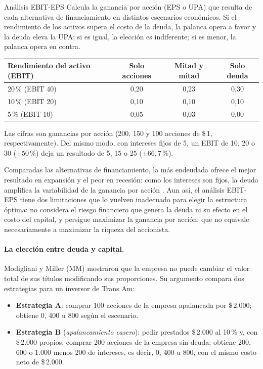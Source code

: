 \begin{definicion}{Análisis EBIT-EPS}
Calcula la ganancia por acción (EPS o UPA) que resulta de cada alternativa de financiamiento en distintos escenarios económicos. Si el rendimiento de los activos supera el costo de la deuda, la palanca opera a favor y la deuda eleva la UPA; si es igual, la elección es indiferente; si es menor, la palanca opera en contra.
\end{definicion}

\begin{ejemplo}[Tres formas de financiar \$\,100 que llevan el activo a \$\,200 ($k_d = 10\,\%$)]
\begin{center}
\begin{tabular}{@{}lccc@{}}
\toprule
Rendimiento del activo (EBIT) & Solo acciones & Mitad y mitad & Solo deuda\\
\midrule
20\,\% (EBIT 40) & 0,20 & 0,23 & 0,30\\
10\,\% (EBIT 20) & 0,10 & 0,10 & 0,10\\
5\,\% (EBIT 10) & 0,05 & 0,03 & 0,00\\
\bottomrule
\end{tabular}
\end{center}
Las cifras son ganancias por acción (200, 150 y 100 acciones de \$\,1, respectivamente). Del mismo modo, con intereses fijos de 5, un EBIT de 10, 20 o 30 ($\pm 50\,\%$) deja un resultado de 5, 15 o 25 ($\pm 66{,}7\,\%$).
\end{ejemplo}

Comparadas las alternativas de financiamiento, la más endeudada ofrece el mejor resultado en expansión y el peor en recesión: como los intereses son fijos, la deuda amplifica la variabilidad de la ganancia por acción . Aun así, el análisis EBIT-EPS tiene dos limitaciones que lo vuelven inadecuado para elegir la estructura óptima: no considera el riesgo financiero que genera la deuda ni su efecto en el costo del capital, y persigue maximizar la ganancia por acción, que no equivale necesariamente a maximizar la riqueza del accionista.

\paragraph{La elección entre deuda y capital.} Modigliani y Miller (MM) mostraron que la empresa no puede cambiar el valor total de sus títulos modificando sus proporciones. Su argumento compara dos estrategias para un inversor de Trans Am:
\begin{itemize}
\item \textbf{Estrategia A}: comprar 100 acciones de la empresa apalancada por \$\,2.000; obtiene 0, 400 u 800 según el escenario.
\item \textbf{Estrategia B} (\emph{apalancamiento casero}): pedir prestados \$\,2.000 al 10\,\% y, con \$\,2.000 propios, comprar 200 acciones de la empresa sin deuda; obtiene 200, 600 o 1.000 menos 200 de intereses, es decir, 0, 400 u 800, con el mismo costo neto de \$\,2.000.
\end{itemize}

